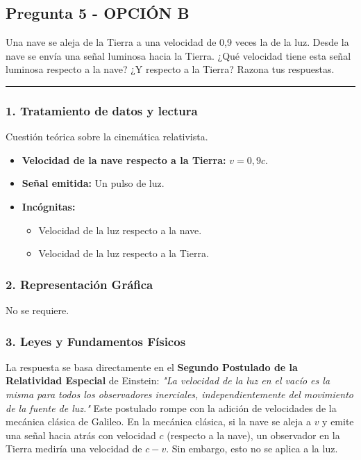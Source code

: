 \newpage

\subsection{Pregunta 5 - OPCIÓN B}
\label{subsec:5B_2003_sep_ext}

\begin{cajaenunciado}
Una nave se aleja de la Tierra a una velocidad de 0,9 veces la de la luz. Desde la nave se envía una señal luminosa hacia la Tierra. ¿Qué velocidad tiene esta señal luminosa respecto a la nave? ¿Y respecto a la Tierra? Razona tus respuestas.
\end{cajaenunciado}
\hrule

\subsubsection*{1. Tratamiento de datos y lectura}
Cuestión teórica sobre la cinemática relativista.
\begin{itemize}
    \item \textbf{Velocidad de la nave respecto a la Tierra:} $v = 0,9c$.
    \item \textbf{Señal emitida:} Un pulso de luz.
    \item \textbf{Incógnitas:}
        \begin{itemize}
            \item Velocidad de la luz respecto a la nave.
            \item Velocidad de la luz respecto a la Tierra.
        \end{itemize}
\end{itemize}

\subsubsection*{2. Representación Gráfica}
No se requiere.

\subsubsection*{3. Leyes y Fundamentos Físicos}
La respuesta se basa directamente en el \textbf{Segundo Postulado de la Relatividad Especial} de Einstein:
\textit{"La velocidad de la luz en el vacío es la misma para todos los observadores inerciales, independientemente del movimiento de la fuente de luz."}
Este postulado rompe con la adición de velocidades de la mecánica clásica de Galileo. En la mecánica clásica, si la nave se aleja a $v$ y emite una señal hacia atrás con velocidad $c$ (respecto a la nave), un observador en la Tierra mediría una velocidad de $c-v$. Sin embargo, esto no se aplica a la luz.

